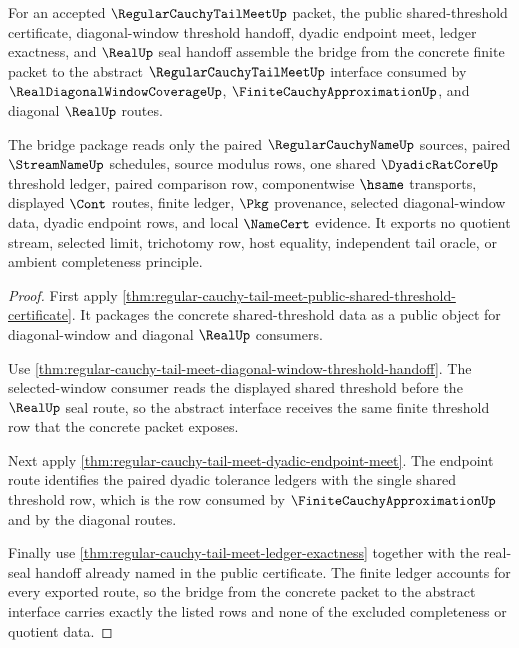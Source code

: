 \begin{theorem}
\label{thm:regular-cauchy-tail-meet-bridge-package}
For an accepted $\RegularCauchyTailMeetUp$ packet, the public shared-threshold certificate, diagonal-window threshold handoff, dyadic endpoint meet, ledger exactness, and $\RealUp$ seal handoff assemble the bridge from the concrete finite packet to the abstract $\RegularCauchyTailMeetUp$ interface consumed by $\RealDiagonalWindowCoverageUp$, $\FiniteCauchyApproximationUp$, and diagonal $\RealUp$ routes.

The bridge package reads only the paired $\RegularCauchyNameUp$ sources, paired $\StreamNameUp$ schedules, source modulus rows, one shared $\DyadicRatCoreUp$ threshold ledger, paired comparison row, componentwise $\hsame$ transports, displayed $\Cont$ routes, finite ledger, $\Pkg$ provenance, selected diagonal-window data, dyadic endpoint rows, and local $\NameCert$ evidence. It exports no quotient stream, selected limit, trichotomy row, host equality, independent tail oracle, or ambient completeness principle.
\end{theorem}
\begin{proof}
First apply \autoref{thm:regular-cauchy-tail-meet-public-shared-threshold-certificate}. It packages the concrete shared-threshold data as a public object for diagonal-window and diagonal $\RealUp$ consumers.

Use \autoref{thm:regular-cauchy-tail-meet-diagonal-window-threshold-handoff}. The selected-window consumer reads the displayed shared threshold before the $\RealUp$ seal route, so the abstract interface receives the same finite threshold row that the concrete packet exposes.

Next apply \autoref{thm:regular-cauchy-tail-meet-dyadic-endpoint-meet}. The endpoint route identifies the paired dyadic tolerance ledgers with the single shared threshold row, which is the row consumed by $\FiniteCauchyApproximationUp$ and by the diagonal routes.

Finally use \autoref{thm:regular-cauchy-tail-meet-ledger-exactness} together with the real-seal handoff already named in the public certificate. The finite ledger accounts for every exported route, so the bridge from the concrete packet to the abstract interface carries exactly the listed rows and none of the excluded completeness or quotient data.
\end{proof}

